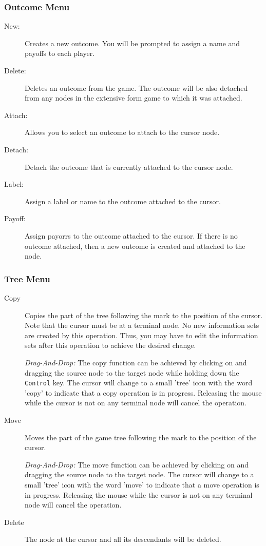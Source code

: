 {\subsubsection{Outcome Menu}
\begin{description}
\item[New:] Creates a new outcome.  You will be prompted to assign a name and 
payoffs to each player.  
\item[Delete:] Deletes an outcome from the game.  The outcome will be also 
detached from any nodes in the extensive form game to which it was attached. 
\item[Attach:] Allows you to select an outcome to attach to the cursor node.  
\item[Detach:] Detach the outcome that is currently attached to the cursor node. 
\item[Label:]  Assign a label or name to the outcome attached to the cursor.  
\item[Payoff:]  Assign payorrs to the outcome attached to the cursor.  If there 
is no outcome attached, then a new outcome is created and attached to the node.  
\end{description}

\subsubsection{Tree Menu}
\begin{description}
\item[Copy] Copies the part of the tree following the mark to the 
position of the cursor.  Note that the cursor must be at a terminal node.  No 
new information sets are created by this operation.  Thus, you may have to edit the 
information sets after this operation to achieve the desired change. 

{\em Drag-And-Drop:} The copy function can be achieved by clicking on and
dragging the source node to the target node while holding down the {\tt Control}
 key.  The cursor will change to a small 'tree' icon with the word 'copy'
to indicate that a copy operation is in progress.  Releasing the mouse while
the cursor is not on any terminal node will cancel the operation.
\item[Move] Moves the part of the game tree following the mark to the position of 
the cursor.  

{\em Drag-And-Drop:} The move function can be achieved by clicking on and
dragging the source node to the target node. The cursor will change to a small
 'tree' icon with the word 'move'
to indicate that a move operation is in progress.  Releasing the mouse while
the cursor is not on any terminal node will cancel the operation.
\item[Delete]  The node at the cursor and all its descendants will be deleted.


\end{description}}
